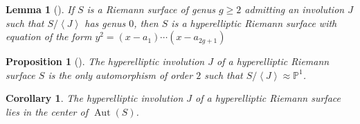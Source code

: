 \documentclass[reqno]{amsart}
\newtheorem{lemma}[theorem]{Lemma}
\newtheorem{proposition}[theorem]{Proposition}
\newtheorem{corollary}[theorem]{Corollary}
\theoremstyle{definition}
\theoremstyle{remark}
\DeclareMathOperator{\Aut}{Aut}
\begin{document}
\begin{lemma}[]
    If $S$ is a Riemann surface of genus $g \ge 2$ admitting
    an involution $J$ such that
    $S / \left<J \right>$ has genus $0$, then
    $S$ is a hyperelliptic Riemann surface with
    equation of the form
    $y^2 = \left( x-a_1 \right) \cdots
    \left( x- a_{2g+1} \right) $
\end{lemma}

\begin{proposition}[]
    The hyperelliptic involution
    $J$ of a hyperelliptic Riemann surface $S$ is
    the only automorphism of order $2$ such that
    $S / \left<J \right> \approx \mathbb{P}^{1}$.
\end{proposition}

\begin{corollary}\label{hyperelliptic-involution-in-center}
    The hyperelliptic involution $J$ of a hyperelliptic
    Riemann surface lies in the center of
    $\Aut (S)$.
\end{corollary}


          




\newpage

\printbibliography
\end{document}
